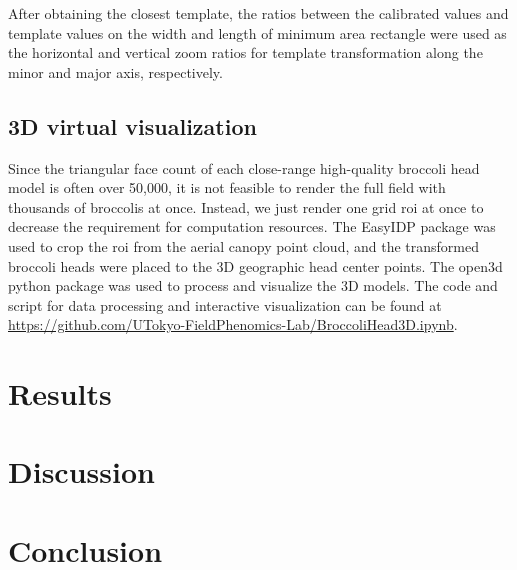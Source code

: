 After obtaining the closest template, the ratios between the calibrated values and template values on the width and length of minimum area rectangle were used as the horizontal and vertical zoom ratios for template transformation along the minor and major axis, respectively.

\subsection{3D virtual visualization}


Since the triangular face count of each close-range high-quality broccoli head model is often over 50,000, it is not feasible to render the full field with thousands of broccolis at once. Instead, we just render one grid \gls{roi} at once to decrease the requirement for computation resources. The EasyIDP package \citep{wang_easyidp_2021} was used to crop the \gls{roi} from the aerial canopy point cloud, and the transformed broccoli heads were placed to the 3D geographic head center points. The open3d python package \citep[\url{https://github.com/isl-org/Open3D}]{zhou_open3d_2018} was used to process and visualize the 3D models. The code and script for data processing and interactive visualization can be found at \url{https://github.com/UTokyo-FieldPhenomics-Lab/BroccoliHead3D.ipynb}.

\section{Results}













\section{Discussion}


\section{Conclusion}